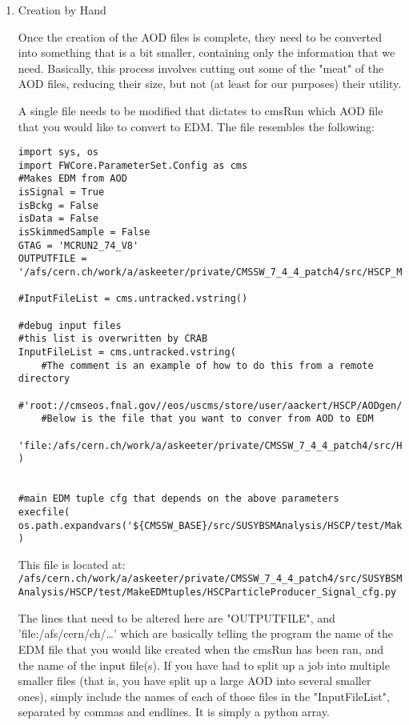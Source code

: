 \documentclass[11pt]{article}
\begin{document}
\begin{enumerate}
\item Creation by Hand
\label{sec-1-1-3-1}

Once the creation of the AOD files is complete, they need to be
converted into something that is a bit smaller, containing only
the information that we need. Basically, this process involves
cutting out some of the "meat" of the AOD files, reducing their
size, but not (at least for our purposes) their utility.

A single file needs to be modified that dictates to cmsRun which
AOD file that you would like to convert to EDM. The file resembles
the following:

\begin{verbatim}
import sys, os
import FWCore.ParameterSet.Config as cms
#Makes EDM from AOD
isSignal = True
isBckg = False
isData = False
isSkimmedSample = False
GTAG = 'MCRUN2_74_V8'
OUTPUTFILE = '/afs/cern.ch/work/a/askeeter/private/CMSSW_7_4_4_patch4/src/HSCP_MC_Root_Files/mchamp3_M_400_EDM.root'

#InputFileList = cms.untracked.vstring()

#debug input files 
#this list is overwritten by CRAB
InputFileList = cms.untracked.vstring(
    #The comment is an example of how to do this from a remote directory
    #'root://cmseos.fnal.gov//eos/uscms/store/user/aackert/HSCP/AODgen/condorjdls/step2_condortest.root',
    #Below is the file that you want to conver from AOD to EDM
    'file:/afs/cern.ch/work/a/askeeter/private/CMSSW_7_4_4_patch4/src/HSCP_MC_Root_Files/mchamp3_M_400_AOD.root'
)


#main EDM tuple cfg that depends on the above parameters
execfile( os.path.expandvars('${CMSSW_BASE}/src/SUSYBSMAnalysis/HSCP/test/MakeEDMtuples/HSCParticleProducer_cfg.py') )
\end{verbatim}

This file is located at:
\texttt{/afs/cern.ch/work/a/askeeter/private/CMSSW\_7\_4\_4\_patch4/src/SUSYBSMAnalysis/HSCP/test/MakeEDMtuples/HSCParticleProducer\_Signal\_cfg.py}

The lines that need to be altered here are "OUTPUTFILE", and
'file:/afs/cern/ch/\ldots{}' which are basically telling the program
the name of the EDM file that you would like created when the
cmsRun has been ran, and the name of the input file(s). If you
have had to split up a job into multiple smaller files (that is,
you have split up a large AOD into several smaller ones), simply
include the names of each of those files in the "InputFileList",
separated by commas and endlines. It is simply a python array.


\end{enumerate}
\end{document}

